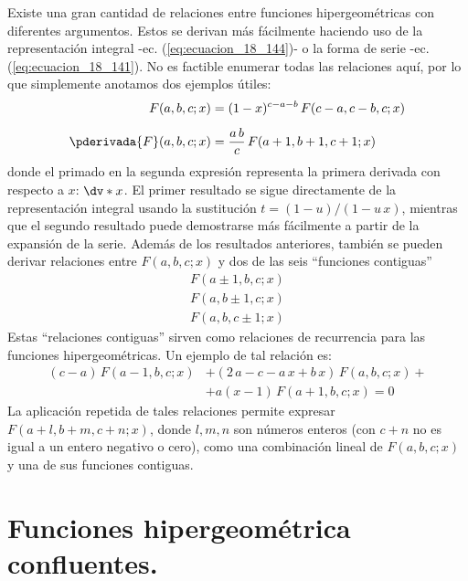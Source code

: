 Existe una gran cantidad de relaciones entre funciones hipergeométricas con diferentes argumentos. Estos se derivan más fácilmente haciendo uso de la representación integral -ec. (\ref{eq:ecuacion_18_144})- o la forma de serie -ec. (\ref{eq:ecuacion_18_141}). No es factible enumerar todas las relaciones aquí, por lo que simplemente anotamos dos ejemplos útiles:
\begin{align}
F(a, b, c; x) &= (1 - x)^{c-a-b} \, F(c - a, c - b, c; x) \label{eq:ecuacion_18_145} \\[0.5em]
\pderivada{F} (a, b, c; x) &= \dfrac{a \, b}{c} \, F(a + 1, b + 1, c + 1; x) \label{eq:ecuacion_18_146}
\end{align}
donde el primado en la segunda expresión representa la primera derivada con respecto a $x$: $\dv*{x}$. El primer resultado se sigue directamente de la representación integral usando la sustitución $t = (1 - u) / (1 - u \, x)$, mientras que el segundo resultado puede demostrarse más fácilmente a partir de la expansión de la serie. Además de los resultados anteriores, también se pueden derivar relaciones entre $F (a, b, c; x)$ y dos de las seis \enquote{funciones contiguas} 
\begin{align*}
F (a \pm 1, b, c; x) \\
F (a, b \pm 1, c; x) \\
F (a, b, c \pm 1; x)
\end{align*}
Estas \enquote{relaciones contiguas} sirven como relaciones de recurrencia para las funciones hipergeométricas. Un ejemplo de tal relación es:
\begin{align*}
(c - a) \, F(a - 1, b, c; x) &+ (2 \, a - c - a \, x +  b \, x) \, F(a, b, c; x) + \\[0.5em]
&+ a (x - 1) \, F(a + 1, b, c; x) = 0
\end{align*}
La aplicación repetida de tales relaciones permite expresar $F (a + l, b + m, c + n; x)$, donde $l, m, n$ son números enteros (con $c + n$ no es igual a un entero negativo o cero), como una combinación lineal de $F(a, b, c; x)$ y una de sus funciones contiguas.

\section{Funciones hipergeométrica confluentes.}

